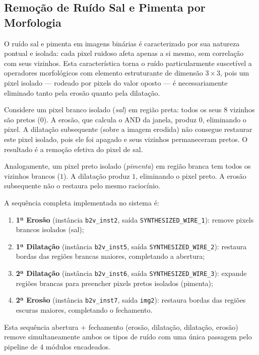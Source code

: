 \documentclass[12pt, a4paper]{article}
\begin{document}
	\subsection{Remoção de Ruído Sal e Pimenta por Morfologia}
	
	O ruído sal e pimenta em imagens binárias é caracterizado por sua natureza
	pontual e isolada: cada pixel ruidoso afeta apenas a si mesmo, sem correlação
	com seus vizinhos. Esta característica torna o ruído particularmente suscetível
	a operadores morfológicos com elemento estruturante de dimensão $3\times3$, pois
	um pixel isolado --- rodeado por pixels do valor oposto --- é necessariamente
	eliminado tanto pela erosão quanto pela dilatação.
	
	Considere um pixel branco isolado (\textit{sal}) em região preta: todos os seus
	8 vizinhos são pretos ($0$). A erosão, que calcula o AND da janela, produz $0$,
	eliminando o pixel. A dilatação subsequente (sobre a imagem erodida) não consegue
	restaurar este pixel isolado, pois ele foi apagado e seus vizinhos permaneceram
	pretos. O resultado é a remoção efetiva do pixel de sal.
	
	Analogamente, um pixel preto isolado (\textit{pimenta}) em região branca tem
	todos os vizinhos brancos ($1$). A dilatação produz $1$, eliminando o pixel
	preto. A erosão subsequente não o restaura pelo mesmo raciocínio.
	
	A sequência completa implementada no sistema é:
	
	\begin{enumerate}
		\item \textbf{1ª Erosão} (instância \texttt{b2v\_inst2}, saída
		\texttt{SYNTHESIZED\_WIRE\_1}): remove pixels brancos isolados (sal);
		\item \textbf{1ª Dilatação} (instância \texttt{b2v\_inst5}, saída
		\texttt{SYNTHESIZED\_WIRE\_2}): restaura bordas das regiões brancas
		maiores, completando a abertura;
		\item \textbf{2ª Dilatação} (instância \texttt{b2v\_inst6}, saída
		\texttt{SYNTHESIZED\_WIRE\_3}): expande regiões brancas para preencher
		pixels pretos isolados (pimenta);
		\item \textbf{2ª Erosão} (instância \texttt{b2v\_inst7}, saída \texttt{img2}):
		restaura bordas das regiões escuras maiores, completando o fechamento.
	\end{enumerate}
	
	Esta sequência abertura + fechamento (erosão, dilatação, dilatação, erosão)
	remove simultaneamente ambos os tipos de ruído com uma única passagem pelo
	pipeline de 4 módulos encadeados.
	
\end{document}
